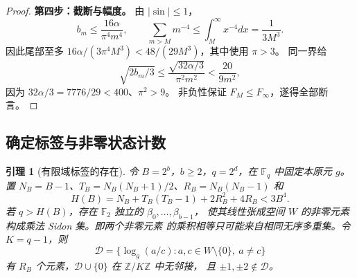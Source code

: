 \documentclass[UTF8,a4paper,11pt,fontset=fandol]{ctexart}
\newtheorem{lemma}{引理}[section]
\theoremstyle{remark}
\begin{document}
\begin{proof}
\textbf{第四步：截断与幅度。}
由 $|\sin|\le1$，
\[
 b_m\le\frac{16\alpha}{\pi^4m^4},\qquad
 \sum_{m>M}m^{-4}\le\int_M^\infty x^{-4}dx=\frac1{3M^3}.
\]
因此尾部至多 $16\alpha/(3\pi^4M^3)<48/(29M^3)$，其中使用 $\pi>3$。
同一界给
\[
 \sqrt{2b_m/3}\le\frac{\sqrt{32\alpha/3}}{\pi^2m^2}
 <\frac{20}{9m^2},
\]
因为 $32\alpha/3=7776/29<400$、$\pi^2>9$。
非负性保证 $F_M\le F_\infty$，遂得全部断言。
\end{proof}

\subsection{确定标签与非零状态计数}
\begin{lemma}[有限域标签的存在]\label{lem:papersidon}
令 $B=2^b$，$b\ge2$，$q=2^d$，在 $\mathbb F_q$ 中固定本原元 $g$。
置 $N_B=B-1$、$T_B=N_B(N_B+1)/2$、$R_B=N_B(N_B-1)$ 和
\[
 H(B)=N_B+T_B(T_B-1)+2R_B^2+4R_B<3B^4.
\]
若 $q>H(B)$，存在 $\mathbb F_2$ 独立的 $\beta_0,\ldots,\beta_{b-1}$，
使其线性张成空间 $W$ 的非零元素构成乘法 Sidon 集。即两个非零元素
的乘积相等只可能来自相同无序多重集。令 $K=q-1$，则
\[
 \mathcal D=\{\log_g(a/c):a,c\in W\setminus\{0\},\ a\ne c\}
\]
有 $R_B$ 个元素，$\mathcal D\cup\{0\}$ 在 $\mathbb Z/K\mathbb Z$ 中无邻接，
且 $\pm1,\pm2\notin\mathcal D$。
\end{lemma}
\end{document}
